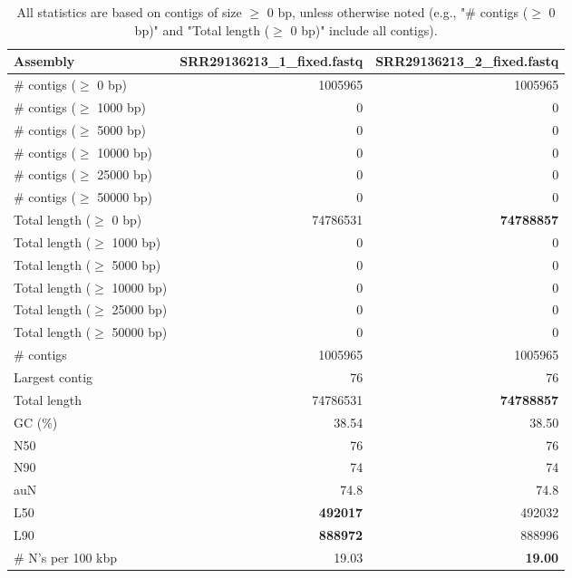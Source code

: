 \documentclass[12pt,a4paper]{article}
\begin{document}
\begin{table}[ht]
\begin{center}
\caption{All statistics are based on contigs of size $\geq$ 0 bp, unless otherwise noted (e.g., "\# contigs ($\geq$ 0 bp)" and "Total length ($\geq$ 0 bp)" include all contigs).}
\begin{tabular}{|l*{2}{|r}|}
\hline
Assembly & SRR29136213\_1\_fixed.fastq & SRR29136213\_2\_fixed.fastq \\ \hline
\# contigs ($\geq$ 0 bp) & 1005965 & 1005965 \\ \hline
\# contigs ($\geq$ 1000 bp) & 0 & 0 \\ \hline
\# contigs ($\geq$ 5000 bp) & 0 & 0 \\ \hline
\# contigs ($\geq$ 10000 bp) & 0 & 0 \\ \hline
\# contigs ($\geq$ 25000 bp) & 0 & 0 \\ \hline
\# contigs ($\geq$ 50000 bp) & 0 & 0 \\ \hline
Total length ($\geq$ 0 bp) & 74786531 & {\bf 74788857} \\ \hline
Total length ($\geq$ 1000 bp) & 0 & 0 \\ \hline
Total length ($\geq$ 5000 bp) & 0 & 0 \\ \hline
Total length ($\geq$ 10000 bp) & 0 & 0 \\ \hline
Total length ($\geq$ 25000 bp) & 0 & 0 \\ \hline
Total length ($\geq$ 50000 bp) & 0 & 0 \\ \hline
\# contigs & 1005965 & 1005965 \\ \hline
Largest contig & 76 & 76 \\ \hline
Total length & 74786531 & {\bf 74788857} \\ \hline
GC (\%) & 38.54 & 38.50 \\ \hline
N50 & 76 & 76 \\ \hline
N90 & 74 & 74 \\ \hline
auN & 74.8 & 74.8 \\ \hline
L50 & {\bf 492017} & 492032 \\ \hline
L90 & {\bf 888972} & 888996 \\ \hline
\# N's per 100 kbp & 19.03 & {\bf 19.00} \\ \hline
\end{tabular}
\end{center}
\end{table}
\end{document}
